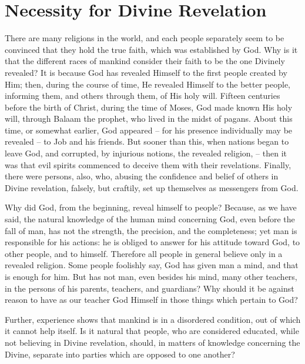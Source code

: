\chapter{Necessity for Divine Revelation}

There are many religions in the world, and each people separately seem to be convinced that they hold the true faith, which was established by God. Why is it that the different races of mankind consider their faith to be the one Divinely revealed? It is because God has revealed Himself to the first people created by Him; then, during the course of time, He revealed Himself to the better people, informing them, and others through them, of His holy will. Fifteen centuries before the birth of Christ, during the time of Moses, God made known His holy will, through Balaam the prophet, who lived in the midst of pagans. About this time, or somewhat earlier, God appeared -- for his presence individually may be revealed -- to Job and his friends. But sooner than this, when nations began to leave God, and corrupted, by injurious notions, the revealed religion, -- then it was that evil spirits commenced to deceive them with their revelations. Finally, there were persons, also, who, abusing the confidence and belief of others in Divine revelation, falsely, but craftily, set up themselves as messengers from God.

Why did God, from the beginning, reveal himself to people? Because, as we have said, the natural knowledge of the human mind concerning God, even before the fall of man, has not the strength, the precision, and the completeness; yet man is responsible for his actions: he is obliged to answer for his attitude toward God, to other people, and to himself. Therefore all people in general believe only in a revealed religion. Some people foolishly say, God has given man a mind, and that is enough for him. But has not man, even besides his mind, many other teachers, in the persons of his parents, teachers, and guardians? Why should it be against reason to have as our teacher God Himself in those things which pertain to God?

Further, experience shows that mankind is in a disordered condition, out of which it cannot help itself. Is it natural that people, who are considered educated, while not believing in Divine revelation, should, in matters of knowledge concerning the Divine, separate into parties which are opposed to one another?

